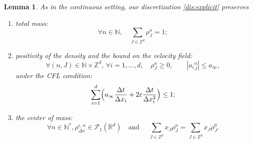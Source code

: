 \documentclass[JEP,XML,SOM,Unicode, NoFloatCountersInSection,published]{cedram}
\def\NN{\mathbb{N}}
\def\RR{\mathbb{R}}
\def\ZZ{\mathbb{Z}}
\def\eps{\varepsilon}
\def\dt{\Delta t}
\def\dx{\Delta x}
\theoremstyle{plain}
\newtheorem{lemma}[theorem]{Lemma}
\theoremstyle{definition}
\begin{document}

\begin{lemma}\label{lem:CFL}
As in the continuous setting, our discretization \eqref{dis:explicit} preserves
\begin{enumerate}
\item total mass:
\begin{equation}\label{eq:conservation}
\forall n \in \NN, \quad \sum_{J \in \ZZ^d} \rho_{J}^n=1;
\end{equation}
\item positivity of the density and the bound on the velocity field:
\[
\forall (n,J) \in \NN \times \ZZ^d, \, \forall i=1,\ldots, d, \quad \rho_{J}^n \geq 0, \qquad |{a_i}_{J}^n| \leq a_\infty,
\]
under the CFL condition:
\begin{equation}\label{CFLlarge}
\sum_{i=1}^d \Bigl(a_\infty \frac{\dt}{\dx_i} + 2\eps \frac{\dt}{\dx_i^2}\Bigr) \leq 1;
\end{equation}
\item the center of mass:
\[
\forall n\in \NN^*, \rho_{\Delta x}^{\eps,n} \in \mathcal{P}_1(\RR^d) \quad\text{and }
\quad \sum_{J\in \ZZ^d} x_J \rho_{J}^n = \sum_{J\in \ZZ^d} x_J \rho_{J}^0.
\]
\end{enumerate}
\end{lemma}
\end{document}

